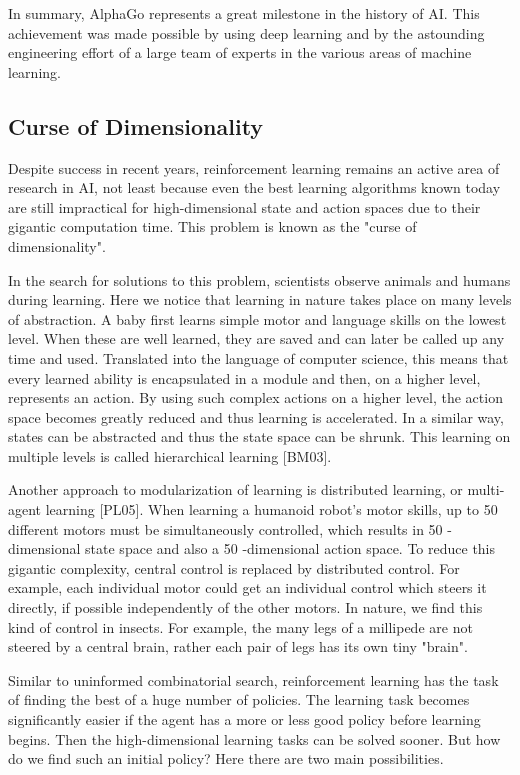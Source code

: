 \documentclass[10pt]{article}
\begin{document}
In summary, AlphaGo represents a great milestone in the history of AI. This achievement was made possible by using deep learning and by the astounding engineering effort of a large team of experts in the various areas of machine learning.

\subsection*{Curse of Dimensionality}
Despite success in recent years, reinforcement learning remains an active area of research in AI, not least because even the best learning algorithms known today are still impractical for high-dimensional state and action spaces due to their gigantic computation time. This problem is known as the "curse of dimensionality".

In the search for solutions to this problem, scientists observe animals and humans during learning. Here we notice that learning in nature takes place on many levels of abstraction. A baby first learns simple motor and language skills on the lowest level. When these are well learned, they are saved and can later be called up any time and used. Translated into the language of computer science, this means that every learned ability is encapsulated in a module and then, on a higher level, represents an action. By using such complex actions on a higher level, the action space becomes greatly reduced and thus learning is accelerated. In a similar way, states can be abstracted and thus the state space can be shrunk. This learning on multiple levels is called hierarchical learning [BM03].

Another approach to modularization of learning is distributed learning, or multi-agent learning [PL05]. When learning a humanoid robot's motor skills, up to 50 different motors must be simultaneously controlled, which results in 50 -dimensional state space and also a 50 -dimensional action space. To reduce this gigantic complexity, central control is replaced by distributed control. For example, each individual motor could get an individual control which steers it directly, if possible independently of the other motors. In nature, we find this kind of control in insects. For example, the many legs of a millipede are not steered by a central brain, rather each pair of legs has its own tiny "brain".

Similar to uninformed combinatorial search, reinforcement learning has the task of finding the best of a huge number of policies. The learning task becomes significantly easier if the agent has a more or less good policy before learning begins. Then the high-dimensional learning tasks can be solved sooner. But how do we find such an initial policy? Here there are two main possibilities.
\end{document}
